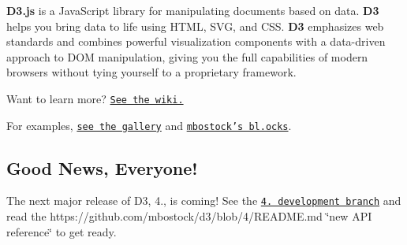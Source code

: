 \href{https://d3js.org}{\tt }

{\bfseries D3.\+js} is a Java\+Script library for manipulating documents based on data. {\bfseries D3} helps you bring data to life using H\+T\+ML, S\+VG, and C\+SS. {\bfseries D3} emphasizes web standards and combines powerful visualization components with a data-\/driven approach to D\+OM manipulation, giving you the full capabilities of modern browsers without tying yourself to a proprietary framework.

Want to learn more? \href{https://github.com/mbostock/d3/wiki}{\tt See the wiki.}

For examples, \href{https://github.com/mbostock/d3/wiki/Gallery}{\tt see the gallery} and \href{http://bl.ocks.org/mbostock}{\tt mbostock’s bl.\+ocks}.

\subsection*{Good News, Everyone!}

The next major release of D3, 4., is coming! See the \href{https://github.com/mbostock/d3/tree/4}{\tt 4. development branch} and read the https\+://github.com/mbostock/d3/blob/4/\+R\+E\+A\+D\+M\+E.\+md \char`\"{}new A\+P\+I reference\char`\"{} to get ready. 